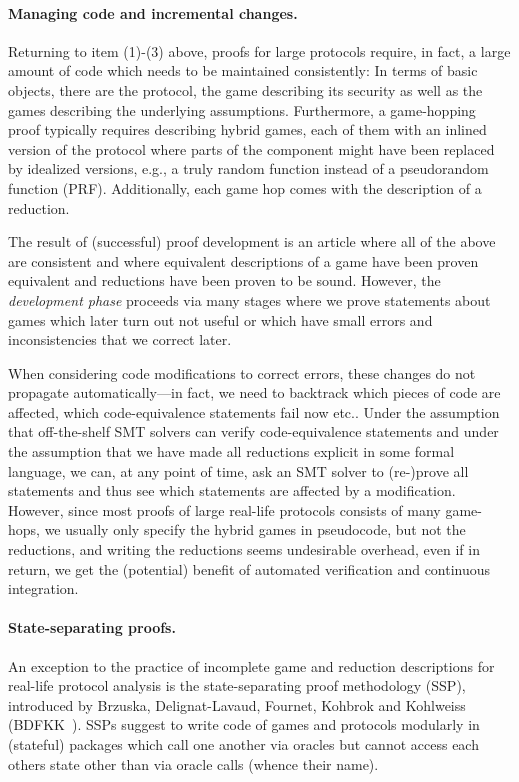 \paragraph{Managing code and incremental changes.}
Returning to item (1)-(3) above, proofs for large protocols require, in fact,
a large amount of code which needs to be maintained consistently: In terms of
basic objects, there are the protocol, the game describing its security as well
 as the games describing the underlying assumptions. Furthermore, a game-hopping
proof typically requires describing hybrid games, each of them with an inlined
version of the protocol where parts of the component might have been replaced
by idealized versions, e.g., a truly random function instead of a pseudorandom function (PRF). Additionally, each game hop comes with the description of a reduction.

The result of (successful) proof development is an article where all of the
above are consistent and where equivalent descriptions of a game have
been proven equivalent and reductions have been proven to be sound.
However, the \emph{development phase} proceeds via many stages where
we prove statements about games which later turn out not useful or
which have small errors and inconsistencies that we correct later.

When considering code modifications to correct errors, these changes do not
propagate automatically---in fact, we need to backtrack which pieces
of code are affected, which code-equivalence statements fail now etc..
Under the assumption that off-the-shelf SMT solvers can verify
code-equivalence statements and under the assumption that we have
made all reductions explicit in some formal language, we can, at 
any point of time, ask an SMT solver to (re-)prove all statements and thus see which
statements are affected by a modification. However, since most proofs
of large real-life protocols consists of many game-hops, we usually only
specify the hybrid games in pseudocode, but not the reductions, and
writing the reductions seems undesirable overhead, even if in return, we
get the (potential) benefit of automated verification and continuous 
integration.

\paragraph{State-separating proofs.}
An exception to the practice of incomplete game and reduction descriptions for
real-life protocol analysis is the state-separating proof methodology (SSP),
introduced by Brzuska, Delignat-Lavaud, Fournet, Kohbrok and Kohlweiss (BDFKK~\cite{X}). SSPs suggest to write code of games and protocols modularly in (stateful) packages which call one another via oracles but cannot access each others state other than
via oracle calls (whence their name). 

